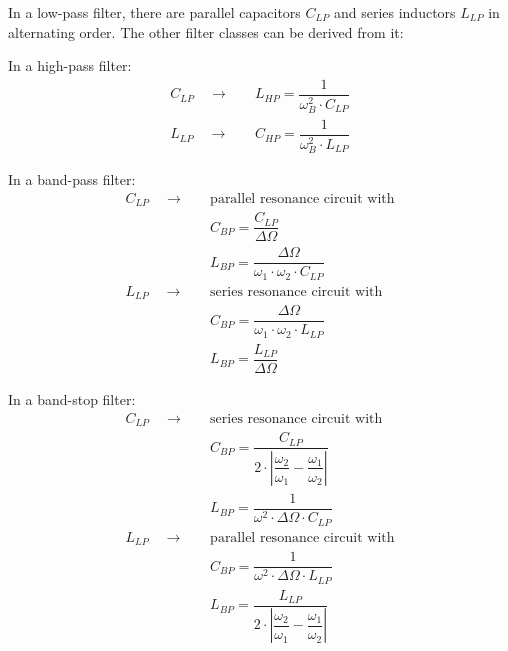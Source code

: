 \addvspace{12pt}

In a low-pass filter, there are  parallel capacitors $C_{LP}$ and
series inductors $L_{LP}$ in alternating order. The other filter
classes can be derived from it:

\addvspace{12pt}

In a high-pass filter:
\begin{align}
C_{LP} \quad \rightarrow \quad & L_{HP} = \dfrac{1}{\omega_B^2\cdot C_{LP}} \\
L_{LP} \quad \rightarrow \quad & C_{HP} = \dfrac{1}{\omega_B^2\cdot L_{LP}}
\end{align}

\addvspace{12pt}

In a band-pass filter:
\begin{align}
C_{LP} \quad \rightarrow \quad & \text{parallel resonance circuit with} \\
                               & C_{BP} = \dfrac{C_{LP}}{\Delta\Omega} \\
                               & L_{BP} = \dfrac{\Delta\Omega}{\omega_1\cdot \omega_2\cdot C_{LP}} \\
L_{LP} \quad \rightarrow \quad & \text{series resonance circuit with} \\
                               & C_{BP} = \dfrac{\Delta\Omega}{\omega_1\cdot \omega_2\cdot L_{LP}} \\
                               & L_{BP} = \dfrac{L_{LP}}{\Delta\Omega}
\end{align}

\addvspace{12pt}

In a band-stop filter:
\begin{align}
C_{LP} \quad \rightarrow \quad & \text{series resonance circuit with} \\
       & C_{BP} = \dfrac{C_{LP}}{2\cdot\left| \dfrac{\omega_2}{\omega_1} - \dfrac{\omega_1}{\omega_2} \right| } \\
       & L_{BP} = \dfrac{1}{\omega^2\cdot \Delta\Omega\cdot C_{LP}} \\
L_{LP} \quad \rightarrow \quad & \text{parallel resonance circuit with} \\
       & C_{BP} = \dfrac{1}{\omega^2\cdot \Delta\Omega\cdot L_{LP}} \\
       & L_{BP} = \dfrac{L_{LP}}{2\cdot\left| \dfrac{\omega_2}{\omega_1} - \dfrac{\omega_1}{\omega_2} \right| }
\end{align}

\addvspace{12pt}

